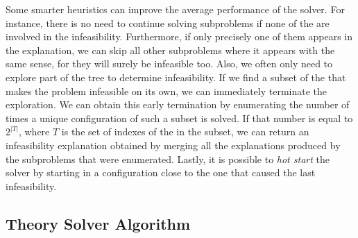 \documentclass[runningheads]{llncs}
\begin{document}
Some smarter heuristics can improve the average performance of the solver.
For instance, there is no need to continue solving subproblems if none of the \nqcs are involved in the infeasibility.
Furthermore, if only precisely one of them appears in the explanation, we can skip all other subproblems where it appears with the same sense, for they will surely be infeasible too.
Also, we often only need to explore part of the tree to determine infeasibility.
If we find a subset of the \nqc that makes the problem infeasible on its own, we can immediately terminate the exploration.
We can obtain this early termination by enumerating the number of times a unique configuration of such a subset is solved.
If that number is equal to $2^{|T|}$, where $T$ is the set of indexes of the \nqcs in the subset, we can return an infeasibility explanation obtained by merging all the explanations produced by the subproblems that were enumerated.
Lastly, it is possible to \textit{hot start} the solver by starting in a configuration close to the one that caused the last infeasibility.


\subsection{Theory Solver Algorithm}
\end{document}
